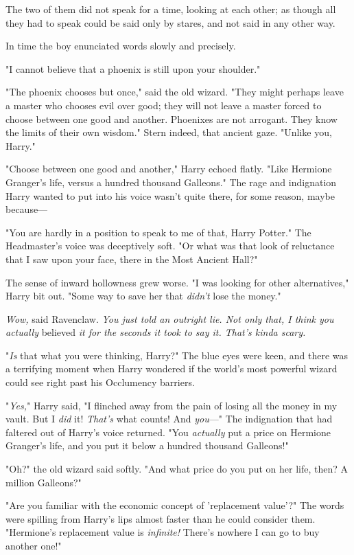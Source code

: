The two of them did not speak for a time, looking at each other; as though all 
they had to speak could be said only by stares, and not said in any other way.

In time the boy enunciated words slowly and precisely.

"I cannot believe that a phoenix is still upon your shoulder."

"The phoenix chooses but once," said the old wizard. "They might perhaps leave 
a master who chooses evil over good; they will not leave a master forced to 
choose between one good and another. Phoenixes are not arrogant. They know the 
limits of their own wisdom." Stern indeed, that ancient gaze. "Unlike you, 
Harry."

"Choose between one good and another," Harry echoed flatly. "Like Hermione 
Granger's life, versus a hundred thousand Galleons." The rage and indignation 
Harry wanted to put into his voice wasn't quite there, for some reason, maybe 
because---

"You are hardly in a position to speak to me of that, Harry Potter." The 
Headmaster's voice was deceptively soft. "Or what was that look of reluctance 
that I saw upon your face, there in the Most Ancient Hall?"

The sense of inward hollowness grew worse. "I was looking for other 
alternatives," Harry bit out. "Some way to save her that \emph{didn't} lose the 
money."

\emph{Wow,} said Ravenclaw. \emph{You just told an outright lie. Not only that, 
I think you actually} believed\emph{ it for the seconds it took to say it. 
That's kinda scary.}

"\emph{Is} that what you were thinking, Harry?" The blue eyes were keen, and 
there was a terrifying moment when Harry wondered if the world's most powerful 
wizard could see right past his Occlumency barriers.

"\emph{Yes,}" Harry said, "I flinched away from the pain of losing all the 
money in my vault. But I \emph{did} it! \emph{That's} what counts! And 
\emph{you}---" The indignation that had faltered out of Harry's voice returned. 
"You \emph{actually} put a price on Hermione Granger's life, and you put it 
below a hundred thousand Galleons!"

"Oh?" the old wizard said softly. "And what price do you put on her life, then? 
A million Galleons?"

"Are you familiar with the economic concept of 'replacement value'?" The words 
were spilling from Harry's lips almost faster than he could consider them. 
"Hermione's replacement value is \emph{infinite!} There's nowhere I can go to 
buy another one!"

